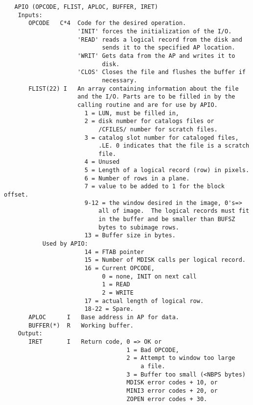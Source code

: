 \begin{verbatim}
   APIO (OPCODE, FLIST, APLOC, BUFFER, IRET)
    Inputs:
       OPCODE   C*4  Code for the desired operation.
                     'INIT' forces the initialization of the I/O.
                     'READ' reads a logical record from the disk and
                            sends it to the specified AP location.
                     'WRIT' Gets data from the AP and writes it to
                            disk.
                     'CLOS' Closes the file and flushes the buffer if
                            necessary.
       FLIST(22) I   An array containing information about the file
                     and the I/O. Parts are to be filled in by the
                     calling routine and are for use by APIO.
                       1 = LUN, must be filled in,
                       2 = disk number for catalogs files or
                           /CFILES/ number for scratch files.
                       3 = catalog slot number for cataloged files,
                           .LE. 0 indicates that the file is a scratch
                           file.
                       4 = Unused
                       5 = Length of a logical record (row) in pixels.
                       6 = Number of rows in a plane.
                       7 = value to be added to 1 for the block offset.
                       9-12 = the window desired in the image, 0's=>
                           all of image.  The logical records must fit
                           in the buffer and be smaller than BUFSZ
                           bytes to subimage rows.
                       13 = Buffer size in bytes.
           Used by APIO:
                       14 = FTAB pointer
                       15 = Number of MDISK calls per logical record.
                       16 = Current OPCODE,
                            0 = none, INIT on next call
                            1 = READ
                            2 = WRITE
                       17 = actual length of logical row.
                       18-22 = Spare.
       APLOC      I   Base address in AP for data.
       BUFFER(*)  R   Working buffer.
    Output:
       IRET       I   Return code, 0 => OK or
                                   1 = Bad OPCODE,
                                   2 = Attempt to window too large
                                       a file.
                                   3 = Buffer too small (<NBPS bytes)
                                   MDISK error codes + 10, or
                                   MINI3 error codes + 20, or
                                   ZOPEN error codes + 30.
\end{verbatim}

